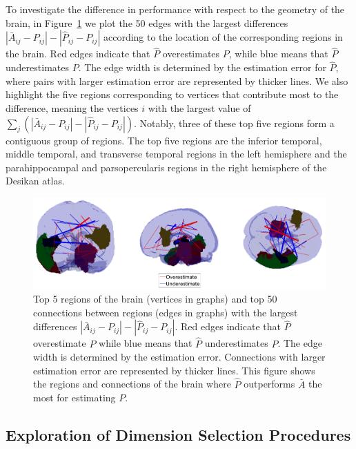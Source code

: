 To investigate the difference in performance with respect to the geometry of the brain, in Figure~\ref{fig:Diff_between_desikan} we plot the 50 edges with the largest differences $|\bar{A}_{ij} - P_{ij}| - |\hat{P}_{ij} - P_{ij}|$ according to the location of the corresponding regions in the brain. Red edges indicate that $\hat{P}$ overestimates $P$, while blue means that $\hat{P}$ underestimates $P$. The edge width is determined by the estimation error for $\hat{P}$, where pairs with larger estimation error are represented by thicker lines.
We also highlight the five regions corresponding to vertices that contribute most to the difference, meaning the vertices $i$ with the largest value of $\sum_j (|\bar{A}_{ij} - P_{ij}| - |\hat{P}_{ij} - P_{ij}|)$.
Notably, three of these top five regions form a contiguous group of regions.
The top five regions are the inferior temporal, middle temporal, and transverse temporal regions in the left hemisphere and the parahippocampal and parsopercularis regions in the right hemisphere of the Desikan atlas.

\begin{figure}
\centering
\includegraphics[width=1\textwidth]{./Figures/Diff_Between_desikan.png}
\caption[Top 5 regions of the brain and top 50 connections between regions with the largest differences between two estimators]{Top 5 regions of the brain (vertices in graphs) and top 50 connections between regions (edges in graphs) with the largest differences $|\bar{A}_{ij} - P_{ij}| - |\hat{P}_{ij} - P_{ij}|$.
Red edges indicate that $\hat{P}$ overestimate $P$ while blue means that $\hat{P}$ underestimates $P$. The edge width is determined by the estimation error. Connections with larger estimation error are represented by thicker lines. This figure shows the regions and connections of the brain where $\hat{P}$ outperforms $\bar{A}$ the most for estimating $P$.}
\label{fig:Diff_between_desikan}
\end{figure}

\subsection{Exploration of Dimension Selection Procedures}

